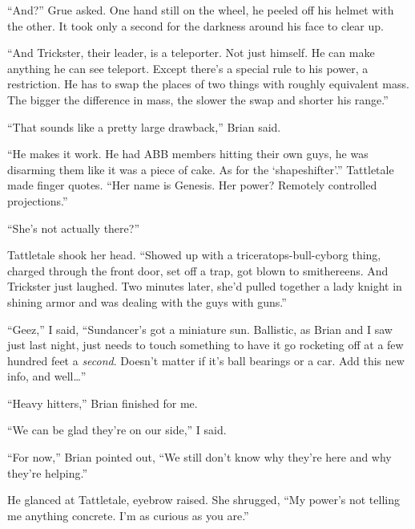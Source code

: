 ``And?'' Grue asked.  One hand still on the wheel, he peeled off his helmet with the other.  It took only a second for the darkness around his face to clear up.



``And Trickster, their leader, is a teleporter.  Not just himself.  He can make anything he can see teleport.  Except there's a special rule to his power, a restriction.  He has to swap the places of two things with roughly equivalent mass.  The bigger the difference in mass, the slower the swap and shorter his range.''



``That sounds like a pretty large drawback,'' Brian said.



``He makes it work.  He had ABB members hitting their own guys, he was disarming them like it was a piece of cake.  As for the `shapeshifter'.''  Tattletale made finger quotes.  ``Her name is Genesis.  Her power?  Remotely controlled projections.''



``She's not actually there?''



Tattletale shook her head.  ``Showed up with a triceratops-bull-cyborg thing, charged through the front door, set off a trap, got blown to smithereens.  And Trickster just laughed.  Two minutes later, she'd pulled together a lady knight in shining armor and was dealing with the guys with guns.''



``Geez,'' I said, ``Sundancer's got a miniature sun.  Ballistic, as Brian and I saw just last night, just needs to touch something to have it go rocketing off at a few hundred feet a \emph{second}.  Doesn't matter if it's ball bearings or a car.  Add this new info, and well\ldots''



``Heavy hitters,'' Brian finished for me.



``We can be glad they're on our side,'' I said.



``For now,'' Brian pointed out, ``We still don't know why they're here and why they're helping.''



He glanced at Tattletale, eyebrow raised.  She shrugged, ``My power's not telling me anything concrete.  I'm as curious as you are.''



